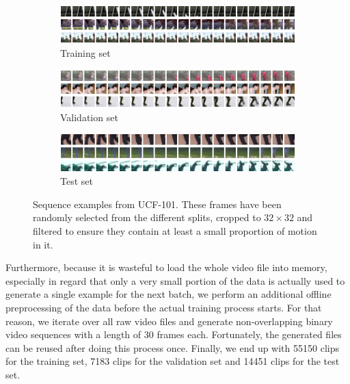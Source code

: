 \begin{figure}[htb]
\centering
\begin{subfigure}{1.0\textwidth}
  \centering
  \includegraphics[width=1.0\linewidth]{figures/ds/ucf_train.png}
  \caption{Training set}
  \label{fig:ucf_train}
  \vspace{.1cm}
\end{subfigure}
\begin{subfigure}{1.0\textwidth}
  \centering
  \includegraphics[width=1.0\linewidth]{figures/ds/ucf_valid.png}
  \caption{Validation set}
  \label{fig:ucf_valid}
  \vspace{.1cm}
\end{subfigure}
\begin{subfigure}{1.0\textwidth}
  \centering
  \includegraphics[width=1.0\linewidth]{figures/ds/ucf_test.png}
  \caption{Test set}
  \label{fig:ucf_test}
\end{subfigure}
\caption[UCF-101 Crop Image Samples]{Sequence examples from UCF-101. These frames have been randomly selected from the different splits, cropped to $32 \times 32 $ and filtered to ensure they contain at least a small proportion of motion in it.}
\label{fig:ucf}
\end{figure}

Furthermore, because it is wasteful to load the whole video file into memory, especially in regard that only a very small portion of the data is actually used to generate a single example for the next batch, we perform an additional offline preprocessing of the data before the actual training process starts. For that reason, we iterate over all raw video files and generate non-overlapping binary video sequences with a length of \num{30} frames each. Fortunately, the generated files can be reused after doing this process once. Finally, we end up with \num{55150} clips for the training set, \num{7183} clips for the validation set and \num{14451} clips for the test set.


